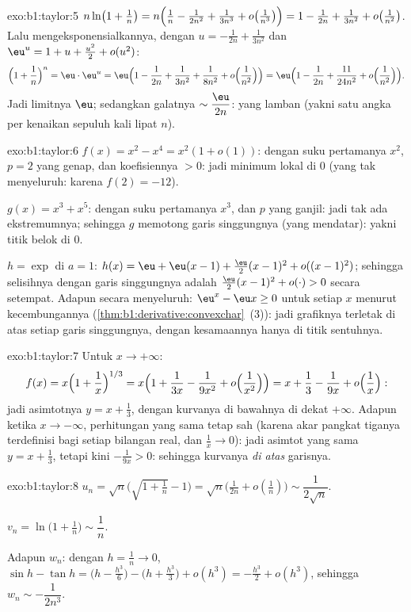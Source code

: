 \begin{solution}{exo:b1:taylor:5}
$n\ln\bigl(1 + \frac1n\bigr) = n\Bigl(\frac1n - \frac{1}{2n^2} +
\frac{1}{3n^3} + o\bigl(\frac{1}{n^3}\bigr)\Bigr) = 1 - \frac{1}{2n}
+ \frac{1}{3n^2} + o\bigl(\frac{1}{n^2}\bigr)$. Lalu mengeksponensialkannya, dengan
$u = -\frac{1}{2n} + \frac{1}{3n^2}$ dan $\eu^u = 1 + u + \frac{u^2}2
+ o(u^2)$:
\[
\Bigl(1 + \frac1n\Bigr)^n = \eu\cdot \eu^{u}
= \eu\Bigl(1 - \frac{1}{2n} + \frac{1}{3n^2} + \frac{1}{8n^2}
+ o\Bigl(\frac{1}{n^2}\Bigr)\Bigr)
= \eu\Bigl(1 - \frac{1}{2n} + \frac{11}{24n^2} +
o\Bigl(\frac{1}{n^2}\Bigr)\Bigr).
\]
Jadi limitnya $\eu$; sedangkan galatnya $\sim \dfrac{\eu}{2n}$: yang lamban (yakni satu angka per
kenaikan sepuluh kali lipat $n$).
\end{solution}

\begin{solution}{exo:b1:taylor:6}
$f(x) = x^2 - x^4 = x^2(1 + o(1))$: dengan suku pertamanya $x^2$, $p = 2$ yang genap,
dan koefisiennya $> 0$: jadi minimum lokal di $0$ (yang tak menyeluruh: karena $f(2) = -12$).

$g(x) = x^3 + x^5$: dengan suku pertamanya $x^3$, dan $p$ yang ganjil: jadi tak ada ekstremumnya; sehingga $g$
memotong garis singgungnya (yang mendatar): yakni titik belok di $0$.

$h = \exp$ di $a = 1$: $h(x) = \eu + \eu(x-1) + \frac{\eu}{2}(x-1)^2
+ o((x-1)^2)$; sehingga selisihnya dengan garis singgungnya adalah
$\frac{\eu}{2}(x-1)^2 + o(\cdot) > 0$ secara setempat. Adapun secara menyeluruh: $\eu^x -
\eu x \geq 0$ untuk setiap $x$ menurut kecembungannya
(\cref{thm:b1:derivative:convexchar}~(3)): jadi grafiknya terletak di atas setiap
garis singgungnya, dengan kesamaannya hanya di titik sentuhnya.
\end{solution}

\begin{solution}{exo:b1:taylor:7}
Untuk $x \to +\infty$:
\[
f(x) = x\Bigl(1 + \frac1x\Bigr)^{1/3}
= x\Bigl(1 + \frac{1}{3x} - \frac{1}{9x^2} +
o\Bigl(\frac{1}{x^2}\Bigr)\Bigr)
= x + \frac13 - \frac{1}{9x} + o\Bigl(\frac1x\Bigr):
\]
jadi asimtotnya $y = x + \frac13$, dengan kurvanya di bawahnya di dekat $+\infty$. Adapun ketika $x
\to -\infty$, perhitungan yang sama tetap sah (karena akar pangkat tiganya
terdefinisi bagi setiap bilangan real, dan $\frac1x \to 0$): jadi asimtot yang sama $y = x +
\frac13$, tetapi kini $-\frac{1}{9x} > 0$: sehingga kurvanya \emph{di atas} garisnya.
\end{solution}

\begin{solution}{exo:b1:taylor:8}
$u_n = \sqrt n\bigl(\sqrt{1 + \tfrac1n} - 1\bigr) = \sqrt
n\bigl(\frac{1}{2n} + o(\frac1n)\bigr) \sim \dfrac{1}{2\sqrt n}$.

$v_n = \ln\bigl(1 + \frac1n\bigr) \sim \dfrac 1n$.

Adapun $w_n$: dengan $h = \frac1n \to 0$, $\sin h - \tan h = \bigl(h -
\frac{h^3}{6}\bigr) - \bigl(h + \frac{h^3}{3}\bigr) + o(h^3) =
-\frac{h^3}{2} + o(h^3)$, sehingga $w_n \sim -\dfrac{1}{2n^3}$.
\end{solution}

